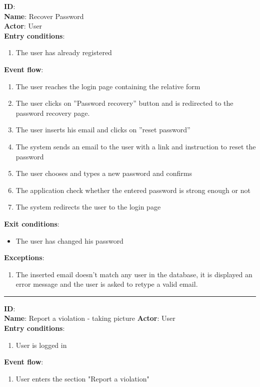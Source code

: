 \begin{enumerate}
\begin{itemize}
		\textbf{ID}:   \\
		\textbf{Name}: Recover Password \\
		\textbf{Actor}: User \\
		\textbf{Entry conditions}:
		\begin{enumerate}
			\item{The user has already registered}
		\end{enumerate}
		\textbf{Event flow}:
		\begin{enumerate}
			\item{The user reaches the login page containing the relative form}
			\item{The user clicks on ”Password recovery” button and is redirected to the password recovery page.}
			\item{The user inserts his email and clicks on ”reset password”}
			\item{The system sends an email to the user with a link and instruction to reset the password}
			\item{The user chooses and types a new password and conﬁrms}
			\item{The application check whether the entered password is strong enough or not}
			\item{The system redirects the user to the login page}
		\end{enumerate}
		\textbf{Exit conditions}:
		\begin{itemize}
			\item{The user has changed his password}
		\end{itemize}
		\textbf{Exceptions}:
		\begin{enumerate}
      		\item{The inserted email doesn't match any user in the database, it is displayed an error message and the user is asked to retype a valid email.}
 		   \end{enumerate}
		\rule{\linewidth}{0.4pt}
    \textbf{ID}:  \\
    \textbf{Name}: Report a violation - taking picture
    \textbf{Actor}: User   \\
    \textbf{Entry conditions}:
    \begin{enumerate}
      \item{User is logged in}
    \end{enumerate}
    \textbf{Event flow}:
    \begin{enumerate}
      \item{User enters the section "Report a violation"}

\end{enumerate}
\end{itemize}
\end{enumerate}
